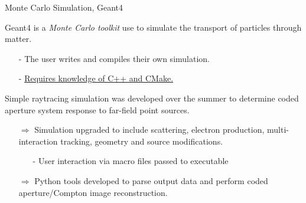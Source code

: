 \documentclass[xcolor=x11names,compress]{beamer}
\renewcommand{\(}{\begin{columns}}
\renewcommand{\)}{\end{columns}}
\newcommand{\<}[1]{\begin{column}{#1}}
\renewcommand{\>}{\end{column}}
\begin{document}
\begin{frame}{Monte Carlo Simulation, Geant4}

Geant4 \cite{Agostinelli} is a \emph{Monte Carlo toolkit} use to simulate the transport of particles through matter.
\begin{itemize}
\small
\item[-] The user writes and compiles their own simulation. %
\item[-] \underline{Requires knowledge of C++ and CMake.}
\end{itemize}

\vspace{3ex}

Simple raytracing simulation was developed over the summer to determine coded aperture system response to far-field point sources.

\vspace{2.5ex}

\begin{itemize}
\item[$\Rightarrow$] Simulation upgraded to include scattering, electron production, multi-interaction tracking, geometry and source modifications. 
\begin{itemize}
\small
\item[-] User interaction via macro files passed to executable
\end{itemize}
\item[$\Rightarrow$] Python tools developed to parse output data and perform coded aperture/Compton image reconstruction.
\end{itemize}

\end{frame}
\end{document}
